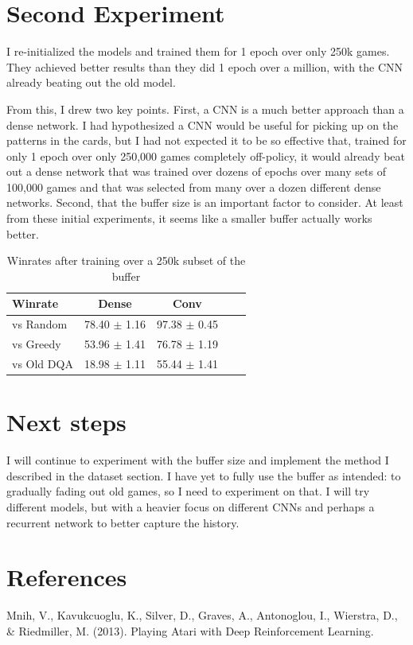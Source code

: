 \documentclass{article}
\begin{document}
\section{Second Experiment}
I re-initialized the models and trained them for 1 epoch over only 250k games. They achieved better results than they did 1 epoch over a million, with the CNN already beating out the old model. 

From this, I drew two key points. First, a CNN is a much better approach than a dense network. I had hypothesized a CNN would be useful for picking up on the patterns in the cards, but I had not expected it to be so effective that, trained for only 1 epoch over only 250,000 games completely off-policy, it would already beat out a dense network that was trained over dozens of epochs over many sets of 100,000 games and that was selected from many over a dozen different dense networks. Second, that the buffer size is an important factor to consider. At least from these initial experiments, it seems like a smaller buffer actually works better.


\begin{table}[t]
\caption{Winrates after training over a 250k subset of the buffer}
\label{sample-table}
\vskip 0.15in
\begin{center}
\begin{small}
\begin{sc}
\begin{tabular}{lcccr}
\toprule
Winrate & Dense & Conv  \\
\midrule
vs Random&  78.40 $\pm$ 1.16 & 97.38 $\pm$ 0.45\\
vs Greedy& 53.96 $\pm$ 1.41 & 76.78 $\pm$ 1.19\\
vs Old DQA& 18.98 $\pm$ 1.11 & 55.44 $\pm$ 1.41 \\
\bottomrule
\end{tabular}
\end{sc}
\end{small}
\end{center}
\vskip -0.1in
\end{table}



\section{Next steps}

I will continue to experiment with the buffer size and implement the method I described in the dataset section. I have yet to fully use the buffer as intended: to gradually fading out old games, so I need to experiment on that. I will try different models, but with a heavier focus on different CNNs and perhaps a recurrent network to better capture the history.

\section{References}
Mnih, V., Kavukcuoglu, K., Silver, D., Graves, A., Antonoglou, I., Wierstra, D., \& Riedmiller, M. (2013). Playing Atari with Deep Reinforcement Learning. 
\end{document}
